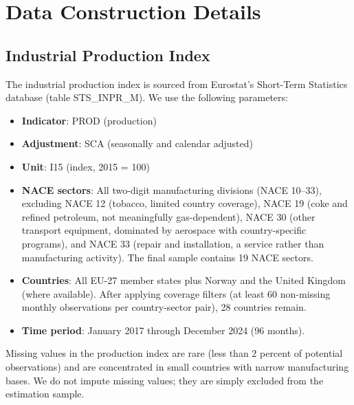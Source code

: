 \documentclass[12pt]{article}
\begin{document}
\label{apep_main_text_end}

\newpage


\newpage
\appendix

\section{Data Construction Details}
\label{app:data}

\subsection{Industrial Production Index}

The industrial production index is sourced from Eurostat's Short-Term Statistics database (table STS\_INPR\_M). We use the following parameters:
\begin{itemize}
    \item \textbf{Indicator}: PROD (production)
    \item \textbf{Adjustment}: SCA (seasonally and calendar adjusted)
    \item \textbf{Unit}: I15 (index, 2015 = 100)
    \item \textbf{NACE sectors}: All two-digit manufacturing divisions (NACE 10--33), excluding NACE 12 (tobacco, limited country coverage), NACE 19 (coke and refined petroleum, not meaningfully gas-dependent), NACE 30 (other transport equipment, dominated by aerospace with country-specific programs), and NACE 33 (repair and installation, a service rather than manufacturing activity). The final sample contains 19 NACE sectors.
    \item \textbf{Countries}: All EU-27 member states plus Norway and the United Kingdom (where available). After applying coverage filters (at least 60 non-missing monthly observations per country-sector pair), 28 countries remain.
    \item \textbf{Time period}: January 2017 through December 2024 (96 months).
\end{itemize}

Missing values in the production index are rare (less than 2 percent of potential observations) and are concentrated in small countries with narrow manufacturing bases. We do not impute missing values; they are simply excluded from the estimation sample.
\end{document}
